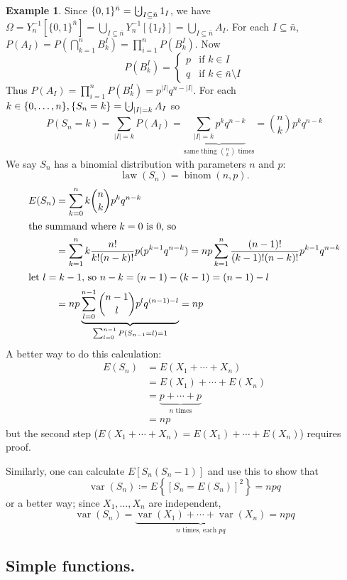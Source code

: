\documentclass{article}
\DeclareMathOperator{\var}{var}
\newcommand{\bigcupdot}{\mathop{\mathchoice{\hspace{0.45em}}{\hspace{0.35em}}{}{}\cdot\mathchoice{\hspace{-0.85em}}{\hspace{-0.725em}}{}{}\bigcup\limits}}
\theoremstyle{definition}
\newtheorem*{example}{Example}
\begin{document}
\begin{example}
Since $\{0,1\}^{\bar{n}} = \bigcupdot_{I \subseteq \bar{n}} {1_I}$, we have $\Omega = Y_n^{-1}\left[\{0,1\}^{\bar{n}}\right] = \bigcup_{I \subseteq \bar{n}} Y_n^{-1}[\{1_I\}] = \bigcup_{I \subseteq \bar{n}} A_I$.
For each $I \subseteq \bar{n}$, $P(A_I) = P\left(\bigcap_{k=1}^n B^I_k\right) = \prod_{i=1}^n P(B^I_k)$. Now
\[
    P(B^I_k) = \begin{cases}
        p & \text{if } k \in I \\
        q & \text{if } k \in \bar{n} \setminus I
    \end{cases}
\]
Thus $P(A_I) = \prod_{i=1}^n P(B^I_k) = p^{|I|}q^{n-|I|}$. For each $k \in \{0, \ldots, n\}, \{S_n = k\} = \bigcupdot_{|I|=k} A_I$ so
\[
    P(S_n = k) = \sum_{|I|=k} P(A_I) = \underbrace{\sum_{|I|=k} p^k q^{n-k}}_{\text{same thing } \binom{n}{k} \text{ times}}
    = \binom{n} {k}p^k q^{n-k}
\]
We say $S_n$ has a binomial distribution with parameters $n$ and $p$:
\[
    \operatorname{law}(S_n) = \operatorname{binom}(n,p).
\]
\begin{align*}
    E(S_n) &= \sum_{k=0}^n k \binom{n}{k} p^k q^{n-k} \\
    \intertext{the summand where $k = 0$ is 0, so}
        &= \sum_{k=1}^n k \frac{n!}{k!(n-k)!} p(p^{k-1}q^{n-k}) = np \sum_{k=1}^n \frac{(n-1)!}{(k-1)!(n-k)!} p^{k-1} q^{n-k} \\
    \intertext{let $l = k-1$, so $n-k = (n-1)-(k-1) = (n-1)-l$}
        &= np \underbrace{\sum_{l=0}^{n-1} \binom{n-1}{l} p^l q^{(n-1)-l}}_{\sum_{l=0}^{n-1} P(S_{n-1} = l) = 1} = np
\end{align*}
A better way to do this calculation:
\begin{align*}
    E(S_n) &= E(X_1 + \cdots + X_n) \\
        &= E(X_1) + \cdots + E(X_n) \\
        &= \underbrace{p + \cdots + p}_{n \text{ times}} \\
        &= np
\end{align*}
but the second step ($E(X_1 + \cdots + X_n) = E(X_1) + \cdots + E(X_n)$) requires proof.

Similarly, one can calculate $E[S_n(S_n - 1)]$ and use this to show that
\[
    \operatorname{var}(S_n) \coloneqq E\left\{ [S_n = E(S_n)]^2 \right\} = npq
\]
or a better way; since $X_1, \ldots, X_n$ are independent,
\[
    \operatorname{var}(S_n) = \underbrace{\var(X_1) + \cdots + \var(X_n)}_{n \text{ times, each }pq} = npq
\]
\end{example}

\subsection*{Simple functions.}
\end{document}
